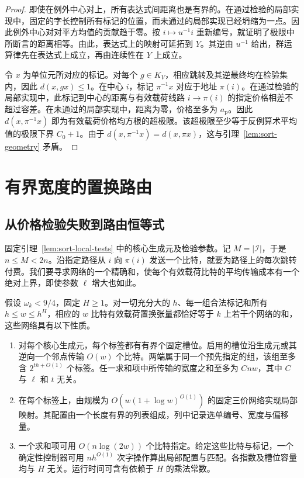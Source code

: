 \begin{proof}
即使在例外中心对上，所有表达式间距离也是有界的。在通过检验的局部实现中，固定的字长控制所有标记的位置，而未通过的局部实现已经坍缩为一点。因此例外中心对对平方均值的贡献趋于零。按 $i\mapsto u^{-1}i$ 重新编号，就证明了极限中所断言的距离相等。由此，表达式上的映射可延拓到 $Y$。其逆由 $u^{-1}$ 给出，群运算律先在表达式上成立，再由连续性在 $Y$ 上成立。

令 $x$ 为单位元所对应的标记。对每个 $g\in K_V$，相应跳转及其逆最终均在检验集内，因此 $d(x,gx)\le1$。在中心 $i$，标记 $\pi^{-1}x$ 对应于地址 $\pi(i)$。在通过检验的局部实现中，此标记到中心的距离与有效载荷线路 $i\to\pi(i)$ 的指定价格相差不超过容差。在未通过的局部实现中，距离为零，价格至多为 $a_{\mathrm p}$。因此 $d(x,\pi^{-1}x)$ 即为有效载荷价格均方根的超极限。该超极限至少等于反例算术平均值的极限下界 $C_0+1$。由于 $d(x,\pi^{-1}x)=d(x,\pi x)$，这与引理~\ref{lem:sort-geometry} 矛盾。\end{proof}

\section{有界宽度的置换路由}\label{sec:sort-route} \subsection{从价格检验失败到路由恒等式}

固定引理~\ref{lem:sort-local-tests} 中的核心生成元及检验参数。记 $M=|\mathcal I|$，于是 $n\le M<2n$。沿指定路径从 $i$ 向 $\pi(i)$ 发送一个比特，就要为路径上的每次跳转付费。我们要寻求网络的一个精确和，使每个有效载荷比特的平均传输成本有一个绝对上界，即使参数 $\ell$ 增大也如此。

\begin{proposition}\label{prop:sort-protocol} 假设 $\omega_k<9/4$，固定 $H\ge1$。对一切充分大的 $h$、每一组合法标记和所有 $h\le w\le h^H$，相应的 $w$ 比特有效载荷置换张量都恰好等于 $k$ 上若干个网络的和，这些网络具有以下性质。\begin{enumerate} \item 对每个核心生成元，每个标签都有有界个固定槽位。启用的槽位沿生成元或其逆向一个邻点传输 $O(w)$ 个比特。两端属于同一个预先指定的组，该组至多含 $2^{th+O(1)}$ 个标签。任一求和项中所传输的宽度之和至多为 $Cnw$，其中 $C$ 与 $\ell$ 和 $t$ 无关。\item 在每个标签上，由规模为 $O(w(1+\log w)^{O(1)})$ 的固定三价网络实现局部映射。其配置由一个长度有界的列表组成，列中记录选单编号、宽度与偏移量。\item 一个求和项可用 $O(n\log(2w))$ 个比特指定。给定这些比特与标记，一个确定性控制器可用 $nh^{O(1)}$ 次字操作算出局部配置与匹配。各指数及槽位容量均与 $H$ 无关。运行时间可含有依赖于 $H$ 的乘法常数。\end{enumerate} \end{proposition}

